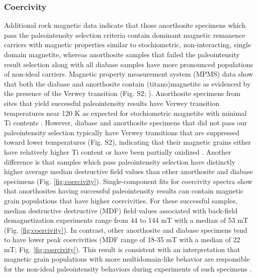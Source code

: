 \documentclass[9pt,twocolumn,twoside,lineno]{pnas-new}
\begin{document}
\subsubsection*{Coercivity}
Additional rock magnetic data indicate that those anorthosite specimens which pass the paleointensity selection criteria contain dominant magnetic remanence carriers with magnetic properties similar to stochiometric, non-interacting, single domain magnetite, whereas anorthosite samples that failed the paleointensity result selection along with all diabase samples have more pronounced populations of non-ideal carriers. Magnetic property measurement system (MPMS) data show that both the diabase and anorthosite contain (titano)magnetite as evidenced by the presence of the Verwey transition (Fig. S2;  \citealp{Verwey1939a, Feinberg2015a}). Anorthosite specimens from sites that yield successful paleointensity results have Verwey transition temperatures near 120 K as expected for stochiometric magnetite with minimal Ti contents \cite{Ozdemir1993a}. However, diabase and anorthosite specimens that did not pass our paleointensity selection typically have Verwey transitions that are suppressed toward lower temperatures (Fig. S2), indicating that their magnetic grains either have relatively higher Ti content or have been partially oxidized \cite{Ozdemir1993a}. Another difference is that samples which pass paleointensity selection have distinctly higher average median destructive field values than other anorthosite and diabase specimens (Fig. \ref{fig:coercivity}). Single-component fits for coercivity spectra \cite{Maxbauer2016a} show that anorthosites having successful paleointensity results can contain magnetic grain populations that have higher coercivities. For these successful samples, median destructive destructive (MDF) field values associated with back-field demagnetization experiments range from 44 to 144 mT with a median of 53 mT (Fig. \ref{fig:coercivity}). In contrast, other anorthosite and diabase specimens tend to have lower peak coercivities (MDF range of 18-35 mT with a median of 22 mT; Fig. \ref{fig:coercivity}). This result is consistent with an interpretation that magnetic grain populations with more multidomain-like behavior are responsible for the non-ideal paleointensity behaviors during experiments of such specimens \cite{Xu2004a}.
\end{document}
